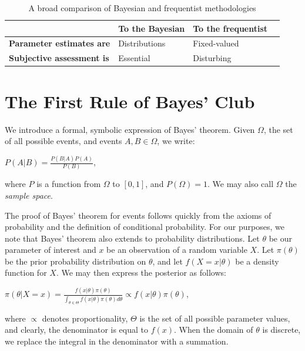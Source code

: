 \documentclass[12pt,twoside]{reedthesis}
\begin{document}
\begin{table}[htdp] %
\caption[Comparison of Bayesian and Frequentist Reasoning]{A broad comparison of Bayesian and frequentist methodologies} 
\begin{center}
\begin{tabular}{l l l l} 

   &  \textbf{To the Bayesian} & \textbf{To the frequentist} \\ %
  \midrule %
\textbf{Parameter estimates are} & Distributions  & Fixed-valued \\ %
\textbf{Subjective assessment is} & Essential & Disturbing \\
\bottomrule %
\end{tabular}
\end{center}
\label{bvf} %
\end{table}

\section{The First Rule of Bayes' Club}

We introduce a formal, symbolic expression of Bayes' theorem. Given $\Omega$, the set of all possible events, and events $A, B \in \Omega$, we write:

\begin{center}
	$P(A | B) = \displaystyle\frac{P(B | A)P(A)}{P(B)}$,
\end{center}
where $P$ is a function from $\Omega$ to $[0,1]$, and $P(\Omega) = 1$. We may also call $\Omega$ the {\em sample space}.

	The proof of Bayes' theorem for events follows quickly from the axioms of probability and the definition of conditional probability. For our purposes, we note that Bayes' theorem also extends to probability distributions. Let $\theta$ be our parameter of interest and $x$ be an observation of a random variable $X$. Let $\pi(\theta)$ be the prior probability distribution on $\theta$, and let $f(X = x | \theta)$ be a density function for $X$. We may then express the posterior as follows:
\begin{center}
	$\pi(\theta | X = x) = \displaystyle\frac{f(x | \theta)\pi(\theta)}{\int_{\theta \in \Theta}f(x |\theta)\pi(\theta)d\theta} \propto f({x} | \theta)\pi(\theta)$,
\end{center}
where $\propto$ denotes proportionality, $\Theta$ is the set of all possible parameter values, and clearly, the denominator is equal to $f(x)$. When the domain of $\theta$ is discrete, we replace the integral in the denominator with a summation.
\end{document}
